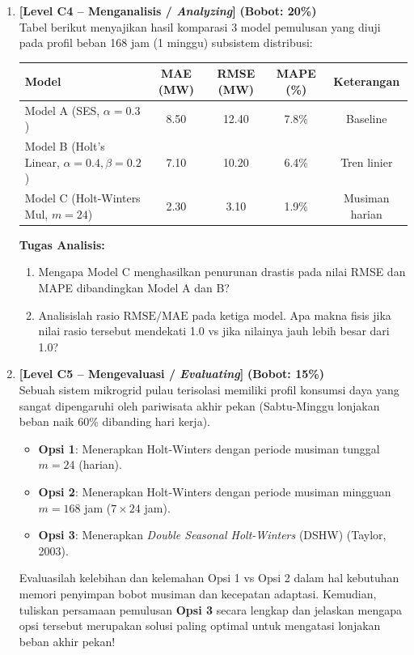 \documentclass[11pt,a4paper]{article}
\begin{document}
\begin{enumerate}[leftmargin=1.5em, label=\textbf{Soal \arabic*.}]
    \newpage

    \item \textbf{[Level C4 -- Menganalisis / \textit{Analyzing}]} \hfill \textbf{(Bobot: 20\%)} \\
    Tabel berikut menyajikan hasil komparasi 3 model pemulusan yang diuji pada profil beban 168 jam (1 minggu) subsistem distribusi:
    \begin{center}
    \begin{tabular}{|l|c|c|c|c|}
    \hline
    \rowcolor{boxbg}
    \textbf{Model} & \textbf{MAE (MW)} & \textbf{RMSE (MW)} & \textbf{MAPE (\%)} & \textbf{Keterangan} \\ \hline
    Model A (SES, $\alpha=0.3$) & 8.50 & 12.40 & 7.8\% & Baseline \\ \hline
    Model B (Holt's Linear, $\alpha=0.4, \beta=0.2$) & 7.10 & 10.20 & 6.4\% & Tren linier \\ \hline
    Model C (Holt-Winters Mul, $m=24$) & 2.30 & 3.10 & 1.9\% & Musiman harian \\ \hline
    \end{tabular}
    \end{center}
    \textbf{Tugas Analisis:}
    \begin{enumerate}[label=\alph*.]
        \item Mengapa Model C menghasilkan penurunan drastis pada nilai RMSE dan MAPE dibandingkan Model A dan B?
        \item Analisislah rasio $\text{RMSE} / \text{MAE}$ pada ketiga model. Apa makna fisis jika nilai rasio tersebut mendekati 1.0 vs jika nilainya jauh lebih besar dari 1.0?
    \end{enumerate}

    \vspace{0.4cm}

    \item \textbf{[Level C5 -- Mengevaluasi / \textit{Evaluating}]} \hfill \textbf{(Bobot: 15\%)} \\
    Sebuah sistem mikrogrid pulau terisolasi memiliki profil konsumsi daya yang sangat dipengaruhi oleh pariwisata akhir pekan (Sabtu-Minggu lonjakan beban naik 60\% dibanding hari kerja).
    \begin{itemize}
        \item \textbf{Opsi 1}: Menerapkan Holt-Winters dengan periode musiman tunggal $m=24$ (harian).
        \item \textbf{Opsi 2}: Menerapkan Holt-Winters dengan periode musiman mingguan $m=168$ jam ($7 \times 24$ jam).
        \item \textbf{Opsi 3}: Menerapkan \textit{Double Seasonal Holt-Winters} (DSHW) (Taylor, 2003).
    \end{itemize}
    Evaluasilah kelebihan dan kelemahan Opsi 1 vs Opsi 2 dalam hal kebutuhan memori penyimpan bobot musiman dan kecepatan adaptasi. Kemudian, tuliskan persamaan pemulusan \textbf{Opsi 3} secara lengkap dan jelaskan mengapa opsi tersebut merupakan solusi paling optimal untuk mengatasi lonjakan beban akhir pekan!


\end{enumerate}
\end{document}
